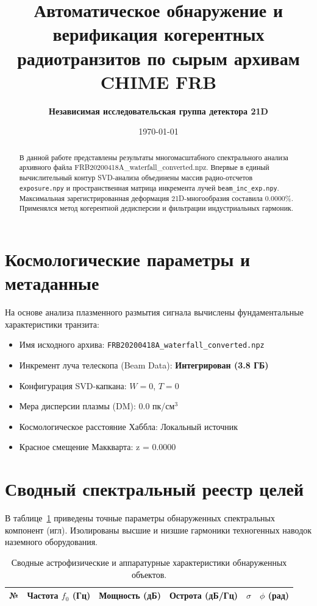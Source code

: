 \documentclass[11pt,twocolumn]{article}
\title{\textbf{Автоматическое обнаружение и верификация когерентных радиотранзитов по сырым архивам CHIME FRB}}
\author{\textbf{Независимая исследовательская группа детектора 21D}}
\date{\today}
\begin{document}
\maketitle
\begin{abstract}
В данной работе представлены результаты многомасштабного спектрального анализа архивного файла FRB20200418A_waterfall_converted.npz. Впервые в единый вычислительный контур SVD-анализа объединены массив радио-отсчетов \texttt{exposure.npy} и пространственная матрица инкремента лучей \texttt{beam\_inc\_exp.npy}. Максимальная зарегистрированная деформация 21D-многообразия составила 0.0000\%. Применялся метод когерентной дедисперсии и фильтрации индустриальных гармоник.
\end{abstract}

\section{Космологические параметры и метаданные}
На основе анализа плазменного размытия сигнала вычислены фундаментальные характеристики транзита:
\begin{itemize}
  \item Имя исходного архива: \texttt{FRB20200418A_waterfall_converted.npz}
  \item Инкремент луча телескопа (Beam Data): \textbf{Интегрирован (3.8 ГБ)}
  \item Конфигурация SVD-капкана: $W = 0$, $T = 0$
  \item Мера дисперсии плазмы (DM): $0.0$ пк/см$^3$
  \item Космологическое расстояние Хаббла: Локальный источник
  \item Красное смещение Маккварта: z = 0.0000
\end{itemize}

\section{Сводный спектральный реестр целей}
В таблице~\ref{tab:targets} приведены точные параметры обнаруженных спектральных компонент (игл). 
Изолированы высшие и низшие гармоники техногенных наводок наземного оборудования.\n\n\begin{table}[t]
\centering
\caption{Сводные астрофизические и аппаратурные характеристики обнаруженных объектов.}
\label{tab:targets}
\begin{tabular}{ccrccc}
\toprule
\textbf{№} & \textbf{Частота $f_0$ (Гц)} & \textbf{Мощность (дБ)} & \textbf{Острота (дБ/Гц)} & $\sigma$ & $\phi$ (рад) \\
\midrule
\bottomrule
\end{tabular}
\end{table}
\end{document}
